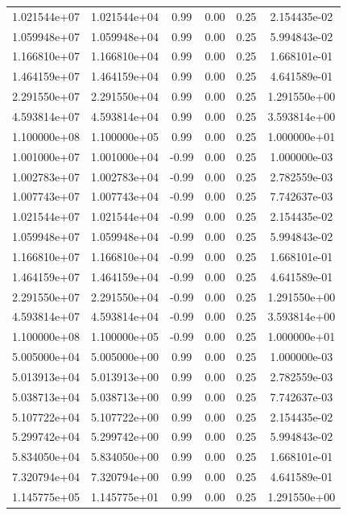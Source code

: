 \documentclass{article}
\begin{document}
\begin{table}[htbp]
\begin{tabular}{cccccc}
1.021544e+07 & 1.021544e+04 & 0.99 & 0.00 & 0.25 & 2.154435e-02 \\
1.059948e+07 & 1.059948e+04 & 0.99 & 0.00 & 0.25 & 5.994843e-02 \\
1.166810e+07 & 1.166810e+04 & 0.99 & 0.00 & 0.25 & 1.668101e-01 \\
1.464159e+07 & 1.464159e+04 & 0.99 & 0.00 & 0.25 & 4.641589e-01 \\
2.291550e+07 & 2.291550e+04 & 0.99 & 0.00 & 0.25 & 1.291550e+00 \\
4.593814e+07 & 4.593814e+04 & 0.99 & 0.00 & 0.25 & 3.593814e+00 \\
1.100000e+08 & 1.100000e+05 & 0.99 & 0.00 & 0.25 & 1.000000e+01 \\
1.001000e+07 & 1.001000e+04 & -0.99 & 0.00 & 0.25 & 1.000000e-03 \\
1.002783e+07 & 1.002783e+04 & -0.99 & 0.00 & 0.25 & 2.782559e-03 \\
1.007743e+07 & 1.007743e+04 & -0.99 & 0.00 & 0.25 & 7.742637e-03 \\
1.021544e+07 & 1.021544e+04 & -0.99 & 0.00 & 0.25 & 2.154435e-02 \\
1.059948e+07 & 1.059948e+04 & -0.99 & 0.00 & 0.25 & 5.994843e-02 \\
1.166810e+07 & 1.166810e+04 & -0.99 & 0.00 & 0.25 & 1.668101e-01 \\
1.464159e+07 & 1.464159e+04 & -0.99 & 0.00 & 0.25 & 4.641589e-01 \\
2.291550e+07 & 2.291550e+04 & -0.99 & 0.00 & 0.25 & 1.291550e+00 \\
4.593814e+07 & 4.593814e+04 & -0.99 & 0.00 & 0.25 & 3.593814e+00 \\
1.100000e+08 & 1.100000e+05 & -0.99 & 0.00 & 0.25 & 1.000000e+01 \\
5.005000e+04 & 5.005000e+00 & 0.99 & 0.00 & 0.25 & 1.000000e-03 \\
5.013913e+04 & 5.013913e+00 & 0.99 & 0.00 & 0.25 & 2.782559e-03 \\
5.038713e+04 & 5.038713e+00 & 0.99 & 0.00 & 0.25 & 7.742637e-03 \\
5.107722e+04 & 5.107722e+00 & 0.99 & 0.00 & 0.25 & 2.154435e-02 \\
5.299742e+04 & 5.299742e+00 & 0.99 & 0.00 & 0.25 & 5.994843e-02 \\
5.834050e+04 & 5.834050e+00 & 0.99 & 0.00 & 0.25 & 1.668101e-01 \\
7.320794e+04 & 7.320794e+00 & 0.99 & 0.00 & 0.25 & 4.641589e-01 \\
1.145775e+05 & 1.145775e+01 & 0.99 & 0.00 & 0.25 & 1.291550e+00 \\

\end{tabular}
\end{table}
\end{document}
